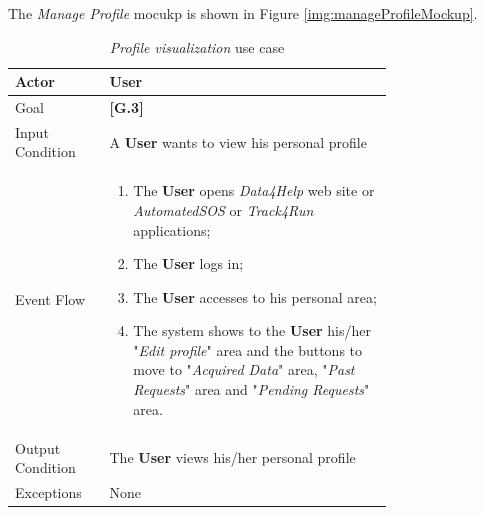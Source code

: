 The \textit{Manage Profile} mocukp is shown in Figure \ref{img:manageProfileMockup}.

\begin{center}
\begin{table}[H]
\begin{tabular}{ | l | p{0.75\linewidth} | }
  \hline
    Actor & \textbf{User} \\ \hline
    Goal & \textbf{[G.3]} \\ \hline
    Input Condition & A \textbf{User} wants to view his personal profile\\ \hline
    Event Flow & \begin{minipage}[t]{0.7\textwidth}
      \begin{enumerate}
        \item The \textbf{User} opens \textit{Data4Help} web site or \textit{AutomatedSOS} or \textit{Track4Run} applications;
        \item The \textbf{User} logs in;
        \item The \textbf{User} accesses to his personal area;
        \item The system shows to the \textbf{User} his/her "\textit{Edit profile}" area and the buttons to move to "\textit{Acquired Data}" area, "\textit{Past Requests}" area and "\textit{Pending Requests}" area.
      \end{enumerate}
    \smallskip
  \end{minipage} \\ \hline
  Output Condition & The \textbf{User} views his/her personal profile\\ \hline
  Exceptions & None \\ \hline
\end{tabular}
\caption{\textit{Profile visualization} use case}
\label{table:profileVisualizationTable}
\end{table}
\end{center}

